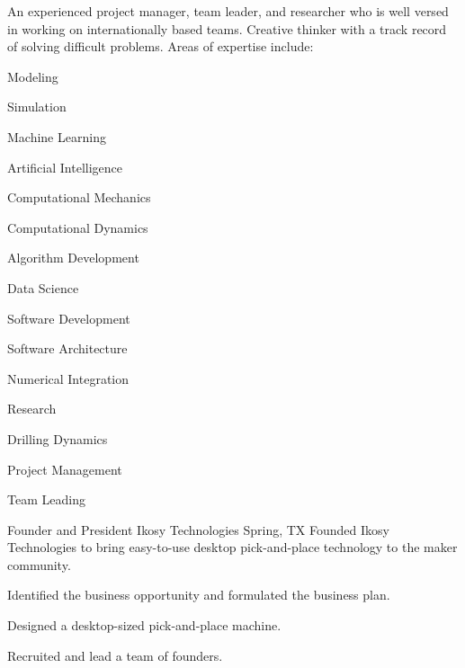 \documentclass{leresume}
\begin{document}
	\thispagestyle{leempty}
	\makeresumeheaderC

	An experienced project manager, team leader, and researcher who is well versed in working on internationally based teams. Creative thinker with a track record of solving difficult problems. Areas of expertise include:
	\vspace{-6pt}
	\begin{multicols}{3}
		\begin{bulletedlist}
			
			\item Modeling
			\item Simulation
			\item Machine Learning
			\item Artificial Intelligence
			\item Computational Mechanics
			\item Computational Dynamics
			\item Algorithm Development
			\item Data Science
			\item Software Development
			\item Software Architecture
			\item Numerical Integration
			\item Research
			\item Drilling Dynamics
			\item Project Management
			\item Team Leading
		\end{bulletedlist}
	\end{multicols}

    
            {Founder and President}
            {Ikosy Technologies}
			{Spring, TX}
			Founded Ikosy Technologies to bring easy-to-use desktop pick-and-place technology to the maker community.
		\begin{bulletedlist}
			
		\item 
					Identified the business opportunity and formulated the business plan.
				
		\item 
					Designed a desktop-sized pick-and-place machine.
				
		\item 
					Recruited and lead a team of founders.
				
		\end{bulletedlist}
	
\end{document}
